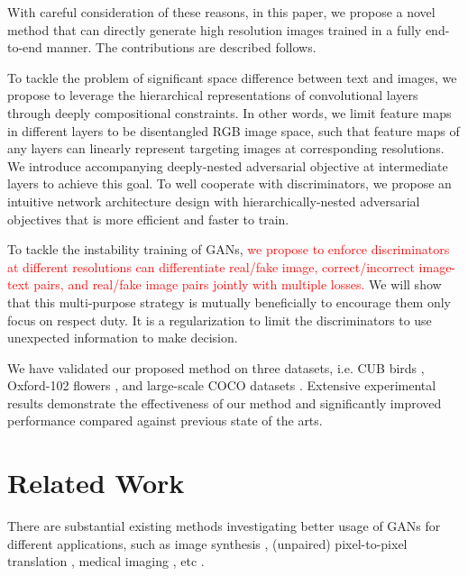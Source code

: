 \documentclass[10pt,twocolumn,letterpaper]{article}
\begin{document}
With careful consideration of these reasons, in this paper, we propose a novel method that can directly generate high resolution images trained in a fully end-to-end manner. The contributions are described follows.

To tackle the problem of significant space difference between text and images, we propose to leverage the hierarchical representations of convolutional layers through deeply compositional constraints. In other words, we limit feature maps in different layers to be disentangled RGB image space, such that feature maps of any layers can linearly represent targeting images at corresponding resolutions. We introduce accompanying deeply-nested adversarial objective at intermediate layers to achieve this goal.
To well cooperate with discriminators, we propose an intuitive network architecture design with hierarchically-nested adversarial objectives that is more efficient and faster to train.

To tackle the instability training of GANs, \textcolor{red}{we propose to enforce discriminators at different resolutions can differentiate real/fake image, correct/incorrect image-text pairs, and real/fake image pairs jointly with multiple losses.} We will show that this multi-purpose strategy is mutually beneficially to encourage them only focus on respect duty. It is a regularization to limit the discriminators to use unexpected information to make decision. 

We have validated our proposed method on three datasets, i.e. CUB birds \cite{}, Oxford-102 flowers \cite{}, and large-scale COCO datasets \cite{}. Extensive experimental results demonstrate the effectiveness of our method and significantly improved performance compared against previous state of the arts.


\section{Related Work}
There are substantial existing methods investigating better usage of GANs \cite{goodfellow2014generative,radford2015unsupervised} for different applications, such as image synthesis \cite{shrivastava2016learning}, (unpaired) pixel-to-pixel translation \cite{isola2016image,zhu2017unpaired},  medical imaging \cite{costa2017towards}, etc \cite{ledig2016photo,huang2016stacked}.
\end{document}
